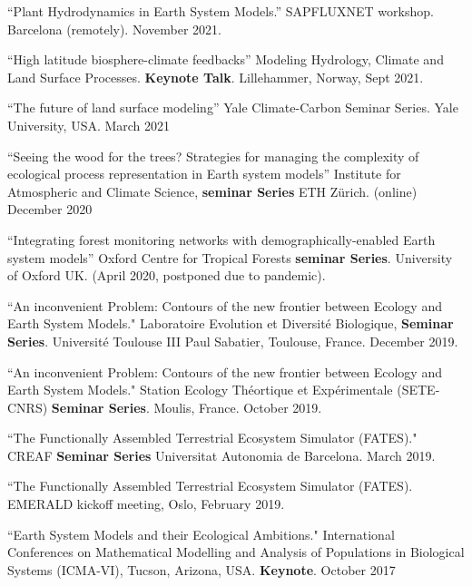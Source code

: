 \documentclass[10pt]{article}
\newenvironment{lonelist}[1][\enskip\textbullet]%
        {\vspace{-\baselineskip}\begin{list}{#1}{%
        \setlength{\itemindent}{-3pt} 
        \setlength{\partopsep}{0pt}%
        \setlength{\leftmargin}{10pt}
        \setlength{\topsep}{15pt}}}
        {\end{list}\vspace{-.3\baselineskip}}
\begin{document}
\begin{lonelist}
\begin{lonelist}
\item ``Plant Hydrodynamics in Earth System Models.'' SAPFLUXNET workshop. Barcelona (remotely). November 2021. 

\item ``High latitude biosphere-climate feedbacks'' Modeling Hydrology, Climate and Land Surface Processes. \textbf{ Keynote Talk}. Lillehammer, Norway, Sept 2021. 

\item ``The future of land surface modeling'' Yale Climate-Carbon Seminar Series. Yale University, USA. March 2021

\item ``Seeing the wood for the trees? Strategies for managing the complexity of ecological process representation in Earth system models'' Institute for Atmospheric and Climate Science, \textbf{seminar Series} ETH Zürich. (online) December 2020

\item ``Integrating forest monitoring networks with demographically-enabled Earth system models'' Oxford Centre for Tropical Forests \textbf{seminar Series}.  University of Oxford UK. (April 2020, postponed due to pandemic). 

\item{``An inconvenient Problem: Contours of the new frontier between Ecology and Earth System Models." Laboratoire Evolution et Diversité Biologique, \textbf{Seminar Series}. Universit\'e Toulouse III Paul Sabatier, Toulouse, France. December 2019.}

\item{``An inconvenient Problem: Contours of the new frontier between Ecology and Earth System Models." Station Ecology Th\'eortique et Exp\'erimentale (SETE-CNRS) \textbf{Seminar Series}. Moulis, France. 
October 2019.}

\item{``The Functionally Assembled Terrestrial Ecosystem Simulator (FATES)." CREAF \textbf{Seminar Series} Universitat Autonomia de Barcelona. March 2019.}

\item{``The Functionally Assembled Terrestrial Ecosystem Simulator (FATES). EMERALD kickoff meeting, Oslo, February 2019.}

\item{``Earth System Models and their Ecological Ambitions." International Conferences on Mathematical Modelling and Analysis of Populations in Biological Systems (ICMA-VI), Tucson, Arizona, USA. \textbf{Keynote}. October 2017}


\end{lonelist}
\end{lonelist}
\end{document}
